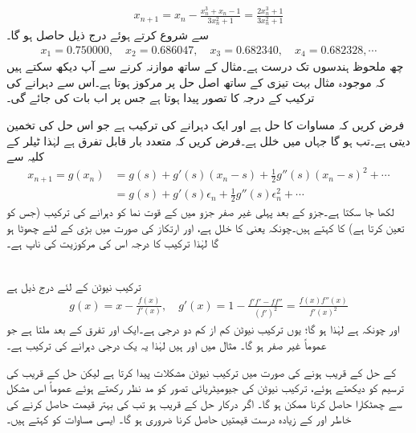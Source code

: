 \begin{align*}
x_{n+1}=x_n-\frac{x_n^3+x_n-1}{3x_n^2+1}=\frac{2x_n^3+1}{3x_n^2+1}
\end{align*}
 سے شروع کرتے ہوئے درج ذیل حاصل ہو گا۔
\begin{align*}
x_1=\num{0.750000},\quad x_2=\num{0.686047},\quad x_3=\num{0.682340},\quad x_4=\num{0.682328},\cdots
\end{align*}
 چھ ملحوظ ہندسوں تک درست ہے۔مثال  کے ساتھ موازنہ کرنے سے آپ دیکھ سکتے ہیں کہ موجودہ مثال بہت تیزی کے ساتھ اصل حل پر مرکوز ہوتا ہے۔اس سے دہرانے کی ترکیب کے درجہ کا تصور پیدا ہوتا ہے جس پر اب بات کی جائے گی۔

فرض کریں کہ مساوات  کا حل  ہے اور   ایک دہرانے کی ترکیب ہے جو اس حل کی تخمین  دیتی ہے۔تب  ہو گا جہاں  میں خلل  ہے۔فرض کریں کہ  متعدد بار قابل تفرق ہے لہٰذا ٹیلر کے کلیہ سے 
\begin{align*}
x_{n+1}=g(x_n)&=g(s)+g'(s)(x_n-s)+\frac{1}{2}g''(s)(x_n-s)^2+\cdots\\
&=g(s)+g'(s)\epsilon_n+\frac{1}{2}g''(s)\epsilon_n^2+\cdots
\end{align*}
لکھا  جا سکتا ہے۔جزو  کے بعد پہلی غیر صفر جزو میں  کے قوت نما کو دہرانے کی ترکیب (جس کو  تعین کرتا ہے) کا  کہتے ہیں۔چونکہ  یعنی  کا خلل ہے، اور ارتکاز کی صورت میں بڑی  کے لئے  چھوٹا ہو گا لہٰذا ترکیب کا درجہ اس کی مرکوزیت کی ناپ ہے۔

\\
ترکیب نیوٹن کے لئے درج ذیل ہے
\begin{align*} 
g(x)=x-\frac{f(x)}{f'(x)},\quad g'(x)=1-\frac{f'f'-ff''}{(f')^2}=\frac{f(x)f''(x)}{f'(x)^2}
\end{align*} 
اور چونکہ  ہے لہٰذا  ہو گا؛ یوں ترکیب نیوٹن کم از کم دو درجی ہے۔ایک اور تفرق کے بعد  ملتا ہے جو عموماً غیر صفر ہو گا۔ مثال  میں  اور  ہیں لہٰذا یہ یک درجی دہرانے کی ترکیب ہے۔

 کے حل کے قریب  ہونے کی صورت میں ترکیب نیوٹن مشکلات پیدا کرتا ہے لیکن حل کے قریب  کی ترسیم  کو دیکھتے ہوئے، ترکیب نیوٹن کی جیومیٹریائی تصور کو مد نظر رکھتے ہوئے عموماً  اس مشکل سے چھٹکارا حاصل کرنا ممکن ہو گا۔ اگر درکار حل کے قریب  ہو تب  کی بہتر قیمت حاصل کرنے کی خاطر   اور  کے زیادہ درست قیمتیں حاصل کرنا ضروری ہو گا۔ ایسی مساوات کو  کہتے ہیں۔

